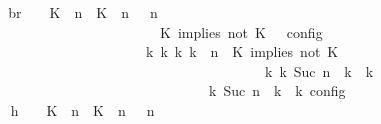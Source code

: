 \begin{isabellebody}
\ \ \ \ \ \ \isamarkupfalse%
\ \isamarkupfalse%
\ br{}{\isacharcolon}\ {\isacartoucheopen}{\isasymrho}\ {\isasymin}\ {\isasymlbrakk}\ {\isacharparenleft}{\isacharparenleft}K\ {\isasymUp}\ n{\isacharparenright}\ {\isacharhash}\ {\isacharparenleft}K\ {\isasymnot}{\isasymUp}\ n{\isacharparenright}\ {\isacharhash}\ {\isasymGamma}{\isacharparenright}{\isacharcomma}\ n\isanewline
\ \ \ \ \ \ \ \ \ \ \ \ \ \ \ \ \ \ \ \ \ \ \ \ \ \ \ \ {\isasymturnstile}\ {\isasymPsi}\ {\isasymtriangleright}\ {\isacharparenleft}{\isacharparenleft}K\ implies\ not\ K\ {\isacharhash}\ {\isasymPhi}{\isacharparenright}\ {\isasymrbrakk}\isactrlsub c\isactrlsub o\isactrlsub n\isactrlsub f\isactrlsub i\isactrlsub g\isanewline
\ \ \ \ \ \ \ \ \ \ \ \ \ \ \ \ \ \ \ \ \ \ \ \ \ \ \ \ {\isasymLongrightarrow}\ {\isasymexists}{\isasymGamma}\isactrlsub k\ {\isasymPsi}\isactrlsub k\ {\isasymPhi}\isactrlsub k\ k{\isachardot}\ {\isacharparenleft}{\isacharparenleft}{\isasymGamma}{\isacharcomma}\ n\ {\isasymturnstile}\ {\isacharparenleft}{\isacharparenleft}K\ implies\ not\ K\ {\isacharhash}\ {\isasymPsi}{\isacharparenright}\ {\isasymtriangleright}\ {\isasymPhi}{\isacharparenright}\isanewline
\ \ \ \ \ \ \ \ \ \ \ \ \ \ \ \ \ \ \ \ \ \ \ \ \ \ \ \ \ \ \ \ \ \ \ \ \ \ \ \ \ \ \ \ \ \ {\isasymhookrightarrow}\isactrlbsup k\isactrlesup \ {\isacharparenleft}{\isasymGamma}\isactrlsub k{\isacharcomma}\ Suc\ n\ {\isasymturnstile}\ {\isasymPsi}\isactrlsub k\ {\isasymtriangleright}\ {\isasymPhi}\isactrlsub k{\isacharparenright}{\isacharparenright}\isanewline
\ \ \ \ \ \ \ \ \ \ \ \ \ \ \ \ \ \ \ \ \ \ \ \ \ \ \ \ \ \ \ \ \ \ {\isasymand}\ {\isasymrho}\ {\isasymin}\ {\isasymlbrakk}\ {\isasymGamma}\isactrlsub k{\isacharcomma}\ Suc\ n\ {\isasymturnstile}\ {\isasymPsi}\isactrlsub k\ {\isasymtriangleright}\ {\isasymPhi}\isactrlsub k\ {\isasymrbrakk}\isactrlsub c\isactrlsub o\isactrlsub n\isactrlsub f\isactrlsub i\isactrlsub g{\isacartoucheclose}\isanewline
\ \ \ \ \ \ \isamarkupfalse%
\ {\isacharminus}\isanewline
\ \ \ \ \ \ \ \ \isamarkupfalse%
\ h{}{\isacharcolon}\ {\isacartoucheopen}{\isasymrho}\ {\isasymin}\ {\isasymlbrakk}\ {\isacharparenleft}{\isacharparenleft}K\ {\isasymUp}\ n{\isacharparenright}\ {\isacharhash}\ {\isacharparenleft}K\ {\isasymnot}{\isasymUp}\ n{\isacharparenright}\ {\isacharhash}\ {\isasymGamma}{\isacharparenright}{\isacharcomma}\ n\isanewline

\end{isabellebody}
